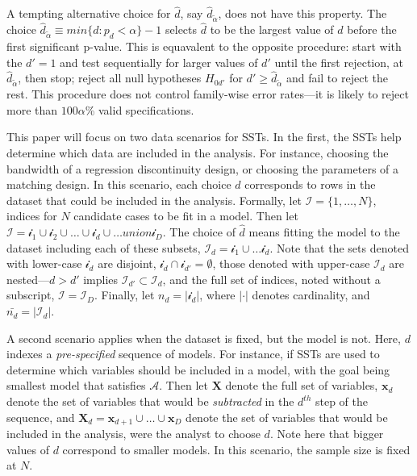 \documentclass[12pt]{article}\usepackage[]{graphicx}\usepackage[]{color}
\begin{document}
A tempting alternative choice for $\hat{d}$, say $\hat{d}_{\tilde{\alpha}}$,
does not have this property.
The choice $\hat{d}_{\tilde{\alpha}}\equiv min\{d: p_d<\alpha\}-1$
selects $\hat{d}$ to be the largest value of $d$ before the first
significant p-value.
This is equavalent to the opposite procedure: start with the $d'=1$
and test sequentially for larger values of $d'$ until the first
rejection, at $\hat{d}_{\tilde{\alpha}}$, then stop; reject all null
hypotheses $H_{0d'}$ for $d'\ge \hat{d}_{\tilde{\alpha}}$ and fail to
reject the rest.
This procedure does not control family-wise error rates---it is likely
to reject more than $100\alpha$\% valid specifications.

This paper will focus on two data scenarios for SSTs.
In the first, the SSTs help determine which data are included in the
analysis.
For instance, choosing the bandwidth of a regression discontinuity
design, or choosing the parameters of a matching design.
In this scenario, each choice $d$ corresponds to rows in the dataset
that could be included in the analysis.
Formally, let $\mathcal{I}=\{1,\dots,N\}$, indices for $N$ candidate
cases to be fit in a model.
Then let $\mathcal{I}=\mathcal{i}_1\cup\mathcal{i}_2\cup\dots\cup
\mathcal{i}_d \cup \dots union \mathcal{i}_D$.
The choice of $\hat{d}$ means fitting the model to the dataset
including each of these subsets,
$\mathcal{I}_d=\mathcal{i}_1\cup\dots\mathcal{i}_d$.
Note that the sets denoted with lower-case $\mathcal{i}_d$ are disjoint,
$\mathcal{i}_d \cap \mathcal{i}_{d'}=\emptyset$,
those denoted with upper-case $\mathcal{I}_d$ are nested---$d>d'$
implies $\mathcal{I}_{d'}\subset \mathcal{I}_d$, and the full set of
indices, noted without a subscript, $\mathcal{I}=\mathcal{I}_D$.
Finally, let $n_d=|\mathcal{i}_d|$, where $|\cdot |$ denotes
cardinality, and $\bar{n_d}=|\mathcal{I}_d |$.

A second scenario applies when the dataset is fixed, but the model is
not.
Here, $d$ indexes a \emph{pre-specified} sequence of models.
For instance, if SSTs are used to determine which variables should be
included in a model, with the goal being smallest model that satisfies
$\mathcal{A}$.
Then let $\bm{X}$ denote the full set of variables, $\bm{x}_d$ denote
the set of variables that would be \emph{subtracted} in the $d^{th}$ step
of the sequence, and $\bm{X}_d=\bm{x}_{d+1} \cup \dots \cup \bm{x}_D$
denote the set of variables that would be included in the analysis,
were the analyst to choose $d$.
Note here that bigger values of $d$ correspond to smaller models.
In this scenario, the sample size is fixed at $N$.
\end{document}
